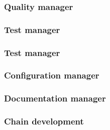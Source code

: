 \documentclass{report}
\begin{document}
\subsubsection{Quality manager}

\paragraph{}
\hspace{4mm}\textnormal{}

\subsubsection{Test manager}

\paragraph{}
\hspace{4mm}\textnormal{}

\subsubsection{Test manager}

\paragraph{}
\hspace{4mm}\textnormal{}

\subsubsection{Configuration manager}

\paragraph{}
\hspace{4mm}\textnormal{}

\subsubsection{Documentation manager}

\paragraph{}
\hspace{4mm}\textnormal{}

\subsubsection{Chain development}
\end{document}
